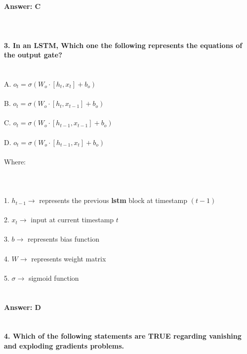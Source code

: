 \documentclass[prl,twocolumn,showpacs,preprintnumbers,superscriptaddress]{revtex4}
\theoremstyle{plain}
\theoremstyle{definition}
\begin{document}
\begin{widetext}
\\
\\
\textbf{Answer: C}
\\
\\
\\
\\
\textbf{3. In an LSTM, Which one the following represents the equations of the output gate?}
\\
\\
\\
A. $o_{t} = \sigma(W_{o} \cdot [h_{t}, x_{t}] + b_{o})$
\\
\\
B. $o_{t} = \sigma(W_{o} \cdot [h_{t}, x_{t - 1}] + b_{o})$
\\
\\
C. $o_{t} = \sigma(W_{o} \cdot [h_{t - 1}, x_{t - 1}] + b_{o})$
\\
\\
D. $o_{t} = \sigma(W_{o} \cdot [h_{t - 1}, x_{t}] + b_{o})$
\\
\\
Where:
\\
\\
\\
\\
1. $h_{t-1} \rightarrow $ represents the previous \textbf{lstm} block at timestamp $(t - 1)$
\\
\\
2. $x_{t} \rightarrow $ input at current timestamp $t$
\\
\\
3. $b \rightarrow $ represents bias function
\\
\\
4. $W \rightarrow $ represents weight matrix %
\\
\\
5. $\sigma \rightarrow$ sigmoid function
\\
\\
\\
\textbf{Answer: D}
\\
\\
\\
\textbf{4. Which of the following statements are TRUE regarding vanishing and exploding gradients problems.}

\end{widetext}
\end{document}
